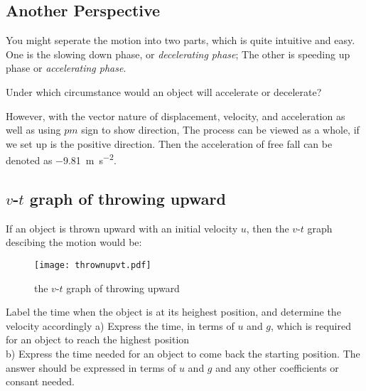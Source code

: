 \documentclass[a4paper]{tufte-handout}
\newenvironment{TaskBox} %
{\begin{tcolorbox}[breakable,colback=b1!30,colframe=b1,title=Task]} {\end{tcolorbox}}
\begin{document}
\subsection{Another Perspective}
You might seperate the motion into two parts, which is quite intuitive and easy. One is the slowing down phase, or \emph{decelerating phase}; The other is speeding up phase or \emph{accelerating phase}.
\begin{TaskBox}
Under which circumstance would an object will accelerate or decelerate?
\end{TaskBox}

However, with the vector nature of displacement, velocity, and acceleration as well as using $pm$ sign to show direction, The process can be viewed as a whole, if we set up is the positive direction. Then the acceleration of free fall can be denoted as \SI{-9.81}{\m\per\square\second}.

\subsection{$v$-$t$ graph of throwing upward}
If an object is thrown upward with an initial velocity $u$, then the $v$-$t$ graph descibing the motion would be:
\begin{figure}[ht]
\texttt{[image: thrownupvt.pdf]}
\caption{the $v$-$t$ graph of throwing upward}
\label{fig:upward vt}
\end{figure}

\begin{TaskBox}
Label the time when the object is at its heighest position, and determine the velocity accordingly
\tcblower
a) Express the time, in terms of $u$ and $g$, which is required for an object to reach the highest position\\
b) Express the time needed for an object to come back the starting position. The answer should be expressed in terms of $u$ and $g$ and any other coefficients or consant needed.
\end{TaskBox}
\end{document}
